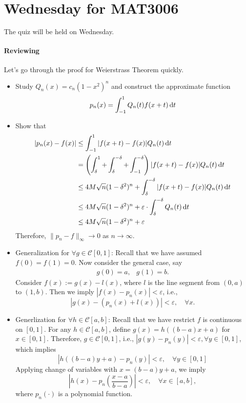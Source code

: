 \section{Wednesday for MAT3006}

The quiz will be held on Wednesday.

\paragraph{Reviewing}Let's go through the proof for Weierstrass Theorem quickly.
\begin{itemize}
\item
Study $Q_n(x) = c_n(1-x^2)^n$ and construct the approximate function
\[
p_n(x) = \int_{-1}^1Q_n(t)f(x+t)\,\mathrm{d} t
\]
\item
Show that 
\begin{align*}
|p_n(x) - f(x)|&\le\int_{-1}^1|f(x+t) - f(x)|Q_n(t)\,\mathrm{d} t\\
&=
\left(\int_{\delta}^1+\int_{\delta}^{-\delta}+ \int_{-1}^{-\delta}\right)|f(x+t)-f(x)|Q_n(t)\,\mathrm{d} t\\
&\le 4M\sqrt{n}(1-\delta^2)^n + \int_{\delta}^{-\delta}|f(x+t)-f(x)|Q_n(t)\,\mathrm{d} t\\
&\le 4M\sqrt{n}(1-\delta^2)^n + \varepsilon\cdot\int_{\delta}^{-\delta}Q_n(t)\,\mathrm{d} t\\
&\le 4M\sqrt{n}(1-\delta^2)^n + \varepsilon
\end{align*}
Therefore, $\|p_n-f\|_\infty\to0$ as $n\to\infty$.
\item
Generalization for $\forall g\in\mathcal{C}[0,1]$:
Recall that we have assumed $f(0)=f(1)=0$. Now consider the general case, say
\[
\begin{array}{ll}
g(0)=a,
&g(1)=b.
\end{array}
\]
Consider $f(x):=g(x) - l(x)$, where $l$ is the line segment from $(0,a)$ to $(1,b)$. Then we imply $|f(x) - p_n(x)|<\varepsilon$, i.e.,
\[
|g(x) - (p_n(x)+l(x))|<\varepsilon,\quad \forall x.
\]
\item
Generlization for $\forall h\in\mathcal{C}[a,b]$: Recall that we have restrict $f$ is continuous on $[0,1]$. For any $h\in\mathcal{C}[a,b]$, define $g(x) = h((b-a)x + a)$ for $x\in[0,1]$. Therefore, $g\in\mathcal{C}[0,1]$, i.e., $|g(y) - p_n(y)|<\varepsilon,\forall y\in[0,1]$, which implies
\[
|h((b-a)y+a) - p_n(y)|<\varepsilon,\quad \forall y\in[0,1]
\]
Applying change of variables with $x=(b-a)y+a$, we imply
\[
\left|h(x) - p_n\left(\frac{x-a}{b-a}\right)\right|<\varepsilon,\quad \forall x\in[a,b],
\]
where $p_n(\cdot)$ is a polynomial function.


\end{itemize}

